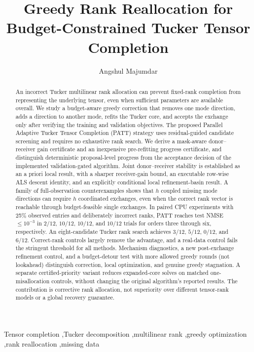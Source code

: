 \documentclass[review,10pt]{elsarticle}
\begin{document}
\begin{frontmatter}
\title{Greedy Rank Reallocation for Budget-Constrained Tucker Tensor Completion}
\author[aff]{Angshul Majumdar}
\begin{abstract}
An incorrect Tucker multilinear rank allocation can prevent fixed-rank completion from representing the underlying tensor, even when sufficient parameters are available overall. We study a budget-aware greedy correction that removes one mode direction, adds a direction to another mode, refits the Tucker core, and accepts the exchange only after verifying the training and validation objectives. The proposed Parallel Adaptive Tucker Tensor Completion (PATT) strategy uses residual-guided candidate screening and requires no exhaustive rank search. We derive a mask-aware donor--receiver gain certificate and an inexpensive pre-refitting progress certificate, and distinguish deterministic proposal-level progress from the acceptance decision of the implemented validation-gated algorithm. Joint donor--receiver stability is established as an a priori local result, with a sharper receiver-gain bound, an executable row-wise ALS descent identity, and an explicitly conditional local refinement-basin result. A family of full-observation counterexamples shows that $h$ coupled missing mode directions can require $h$ coordinated exchanges, even when the correct rank vector is reachable through budget-feasible single exchanges. In paired CPU experiments with 25\% observed entries and deliberately incorrect ranks, PATT reaches test NMSE $\le10^{-3}$ in $2/12$, $10/12$, $10/12$, and $10/12$ trials for orders three through six, respectively. An eight-candidate Tucker rank search achieves $3/12$, $5/12$, $0/12$, and $6/12$. Correct-rank controls largely remove the advantage, and a real-data control fails the stringent threshold for all methods. Mechanism diagnostics, a new post-exchange refinement control, and a budget-detour test with more allowed greedy rounds (not lookahead) distinguish correction, local optimization, and genuine greedy stagnation. A separate certified-priority variant reduces expanded-core solves on matched one-misallocation controls, without changing the original algorithm's reported results. The contribution is corrective rank allocation, not superiority over different tensor-rank models or a global recovery guarantee.
\end{abstract}
\begin{keyword}
Tensor completion \sep Tucker decomposition \sep multilinear rank \sep greedy optimization \sep rank reallocation \sep missing data
\end{keyword}
\end{frontmatter}
\end{document}
